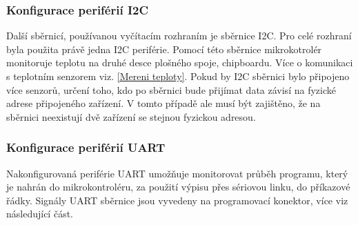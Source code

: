  	\subsubsection{Konfigurace periférií I2C}
 	Další sběrnicí, používanou vyčítacím rozhraním je sběrnice I2C. Pro celé rozhraní byla použita právě jedna I2C periférie. Pomocí této sběrnice mikrokotrolér monitoruje teplotu na druhé desce plošného spoje, chipboardu. Více o komunikaci s teplotním senzorem viz. \ref{Mereni teploty}. Pokud by I2C sběrnici bylo připojeno více senzorů, určení toho, kdo po sběrnici bude přijímat data závisí na fyzické adrese připojeného zařízení. V tomto případě ale musí být zajištěno, že na sběrnici neexistují dvě zařízení se stejnou fyzickou adresou. 
 	
 	\subsubsection{Konfigurace periférií UART}
 	\par Nakonfigurovaná periférie UART umožňuje monitorovat průběh programu, který je nahrán do mikrokontroléru, za použití výpisu přes sériovou linku, do příkazové řádky. Signály UART sběrnice jsou vyvedeny na programovací konektor, více viz následující část.


